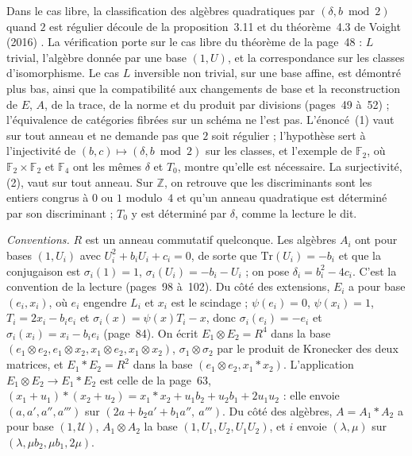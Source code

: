 \begin{remarque}
Dans le cas libre, la classification des algèbres quadratiques par $(\delta, b \bmod 2)$ quand $2$ est régulier découle de la proposition~3.11 et du théorème~4.3 de Voight (2016) \cite{voight2016}. La vérification porte sur le cas libre du théorème de la page~48 : $L$ trivial, l'algèbre donnée par une base $(1, U)$, et la correspondance sur les classes d'isomorphisme. Le cas $L$ inversible non trivial, sur une base affine, est démontré plus bas, ainsi que la compatibilité aux changements de base et la reconstruction de $E$, $A$, de la trace, de la norme et du produit par divisions (pages~49 à~52) ; l'équivalence de catégories fibrées sur un schéma ne l'est pas. L'énoncé~(1) vaut sur tout anneau et ne demande pas que $2$ soit régulier ; l'hypothèse sert à l'injectivité de $(b, c) \mapsto (\delta, b \bmod 2)$ sur les classes, et l'exemple de $\mathbb F_2$, où $\mathbb F_2 \times \mathbb F_2$ et $\mathbb F_4$ ont les mêmes $\delta$ et $T_0$, montre qu'elle est nécessaire. La surjectivité, (2), vaut sur tout anneau. Sur $\mathbb Z$, on retrouve que les discriminants sont les entiers congrus à $0$ ou $1$ modulo~$4$ et qu'un anneau quadratique est déterminé par son discriminant ; $T_0$ y est déterminé par $\delta$, comme la lecture le dit.
\end{remarque}

\noindent\emph{Conventions.} $R$ est un anneau commutatif quelconque. Les algèbres $A_i$ ont pour bases $(1, U_i)$ avec $U_i^2 + b_iU_i + c_i = 0$, de sorte que $\mathrm{Tr}(U_i) = -b_i$ et que la conjugaison est $\sigma_i(1) = 1$, $\sigma_i(U_i) = -b_i - U_i$ ; on pose $\delta_i = b_i^2 - 4c_i$. C'est la convention de la lecture (pages~98 à~102). Du côté des extensions, $E_i$ a pour base $(e_i, x_i)$, où $e_i$ engendre $L_i$ et $x_i$ est le scindage ; $\psi(e_i) = 0$, $\psi(x_i) = 1$, $T_i = 2x_i - b_ie_i$ et $\sigma_i(x) = \psi(x)T_i - x$, donc $\sigma_i(e_i) = -e_i$ et $\sigma_i(x_i) = x_i - b_ie_i$ (page~84). On écrit $E_1 \otimes E_2 = R^4$ dans la base $(e_1 \otimes e_2, e_1 \otimes x_2, x_1 \otimes e_2, x_1 \otimes x_2)$, $\sigma_1 \otimes \sigma_2$ par le produit de Kronecker des deux matrices, et $E_1 * E_2 = R^2$ dans la base $(e_1 \otimes e_2, x_1 * x_2)$. L'application $E_1 \otimes E_2 \to E_1 * E_2$ est celle de la page~63, $(x_1 + u_1) * (x_2 + u_2) = x_1 * x_2 + u_1b_2 + u_2b_1 + 2u_1u_2$ : elle envoie $(a, a', a'', a''')$ sur $(2a + b_2a' + b_1a'',\ a''')$. Du côté des algèbres, $A = A_1 * A_2$ a pour base $(1, \mathcal U)$, $A_1 \otimes A_2$ la base $(1, U_1, U_2, U_1U_2)$, et $i$ envoie $(\lambda, \mu)$ sur $(\lambda, \mu b_2, \mu b_1, 2\mu)$.


